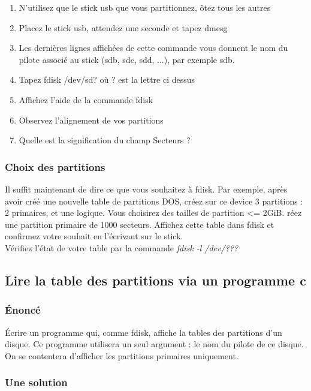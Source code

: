 \begin{enumerate}
\item N'utilisez que le stick usb que vous partitionnez, ôtez tous les autres
\item Placez le stick usb, attendez une seconde et tapez dmesg
\item Les dernières lignes affichées de cette commande vous donnent le nom du pilote associé au stick (sdb, sdc, sdd, ...), par exemple sdb.
\item Tapez fdisk /dev/sd? où ? est la lettre ci dessus
\item Affichez l'aide de la commande fdisk
\item Observez l'alignement de vos partitions
\item Quelle est la signification du champ Secteurs ?
\end{enumerate}

\subsubsection{Choix des partitions}

Il suffit maintenant de dire ce que vous souhaitez à fdisk. Par exemple, après avoir créé une nouvelle table de partitions DOS, créez sur ce device 3 partitions : 2 primaires, et une logique. Vous choisirez des tailles de partition <= 2GiB. réez une partition primaire de 1000 secteurs.
Affichez cette table dans fdisk et confirmez votre souhait en l'écrivant sur le stick.\\
Vérifiez l'état de votre table par la commande \emph{fdisk -l /dev/???}

\subsection{Lire la table des partitions via un programme c}

\subsubsection{Énoncé}

Écrire un programme qui, comme fdisk, affiche la tables des partitions d'un disque. Ce programme utilisera un seul argument : le nom du pilote de ce disque. On se contentera d'afficher les partitions primaires uniquement.
\subsubsection{Une solution}

